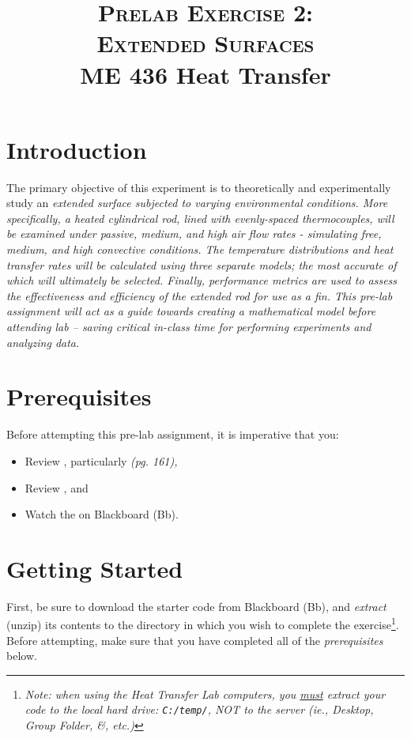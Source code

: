 \documentclass[11pt, letterpaper]{article}
\title{ \textsc{Prelab Exercise 2: \\ Extended Surfaces} \\ {\large  \color{darkgray} ME 436 Heat Transfer}}
\begin{document}
\date{}
\maketitle
\thispagestyle{firstpage} 

\section*{Introduction}

The primary objective of this experiment is to theoretically and experimentally study an \it{extended surface} subjected to varying environmental conditions. More specifically, a heated cylindrical rod, lined with evenly-spaced thermocouples,  will be examined under passive, medium, and high air flow rates - simulating free, medium, and high convective conditions. The temperature distributions and heat transfer rates will be calculated using three separate models; the most accurate of which will ultimately be selected. Finally, performance metrics are used to assess the effectiveness and efficiency of the extended rod for use as a fin.
\n
This pre-lab assignment will act as a guide towards creating a mathematical model before attending lab --  saving critical in-class time for performing experiments and analyzing data. 

\section*{Prerequisites}
Before attempting this pre-lab assignment, it is imperative that you:
{\small
\begin{itemize}
    \item Review , particularly  \it{(pg. 161)},
    \item Review , and
    \item Watch the  on Blackboard (Bb).
\end{itemize}
}


\section*{Getting Started}
First, be sure to download the starter code from Blackboard (Bb), and \textit{extract} (unzip) its contents to the directory in which you wish to complete the exercise\footnote{\textit{Note: when using the Heat Transfer Lab computers, you \ul{must} extract your code to the local hard drive: \texttt{C:/temp/}, NOT to the server (ie., Desktop, Group Folder, \&, etc.)}}. Before attempting, make sure that you have completed all of the \textit{prerequisites} below.
\end{document}
